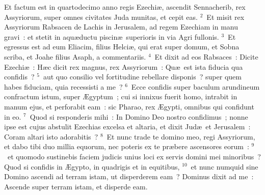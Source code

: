 


\lettrine[lines=3,image=true,loversize=0.05,lraise=-0.03]{E}{}t factum est in quartodecimo anno regis Ezechi\ae , ascendit Sennacherib, rex Assyriorum, super omnes civitates Juda munitas, et cepit eas.
${}^{2}$~Et misit rex Assyriorum Rabsacen de Lachis in Jerusalem, ad regem Ezechiam in manu gravi~: et stetit in aqu\ae ductu piscin\ae\ superioris in via Agri fullonis.
${}^{3}$~Et egressus est ad eum Eliacim, filius Helci\ae , qui erat super domum, et Sobna scriba, et Joahe filius Asaph, a commentariis.
${}^{4}$~Et dixit ad eos Rabsaces~: Dicite Ezechi\ae~: H\ae c dicit rex magnus, rex Assyriorum~: Qu\ae\ est ista fiducia qua confidis~?
${}^{5}$~aut quo consilio vel fortitudine rebellare disponis~? super quem habes fiduciam, quia recessisti a me~?
${}^{6}$~Ecce confidis super baculum arundineum confractum istum, super \AE gyptum~; cui si innixus fuerit homo, intrabit in manum ejus, et perforabit eam~: sic Pharao, rex \AE gypti, omnibus qui confidunt in eo.
${}^{7}$~Quod si responderis mihi~: In Domino Deo nostro confidimus~; nonne ipse est cujus abstulit Ezechias excelsa et altaria, et dixit Jud\ae\ et Jerusalem~: Coram altari isto adorabitis~?
${}^{8}$~Et nunc trade te domino meo, regi Assyriorum, et dabo tibi duo millia equorum, nec poteris ex te pr\ae bere ascensores eorum~:
${}^{9}$~et quomodo sustinebis faciem judicis unius loci ex servis domini mei minoribus~? Quod si confidis in \AE gypto, in quadrigis et in equitibus,
${}^{10}$~et nunc numquid sine Domino ascendi ad terram istam, ut disperderem eam~? Dominus dixit ad me~: Ascende super terram istam, et disperde eam.


